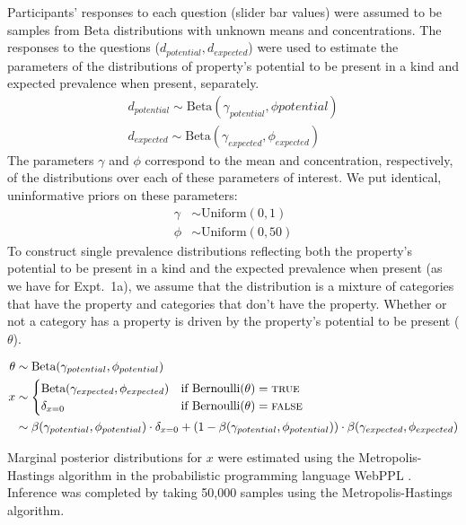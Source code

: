 \documentclass[10pt,letterpaper]{article}
\begin{document}
Participants' responses to each question (slider bar values) were assumed to be samples from Beta distributions with unknown means and concentrations. 
The responses to the questions ($d_{potential}, d_{expected}$) were used to estimate the parameters of the distributions of property's potential to be present in a kind and expected prevalence when present, separately. 
\begin{align*}
d_{potential} \sim \text{Beta}(\gamma_{potential}, \phi{potential}) \\
d_{expected} \sim \text{Beta}(\gamma_{expected}, \phi_{expected}) 
\end{align*}
The parameters $\gamma$ and $\phi$ correspond to the mean and concentration, respectively, of the distributions over each of these parameters of interest.
We put identical, uninformative priors on these parameters:
\begin{align*}
\gamma & \sim \text{Uniform}(0,1) \\
\phi & \sim \text{Uniform}(0,50) 
\end{align*}
To construct single prevalence distributions reflecting both the property's potential to be present in a kind and the expected prevalence when present (as we have for Expt.~1a), we assume that the distribution is a mixture of categories that have the property and categories that don't have the property.
Whether or not a category has a property is driven by the property's potential to be present ($\theta$).
%

\begin{align*}
\theta & \sim \text{Beta}(\gamma_{potential}, \phi_{potential}) \\ 
x & \sim \begin{cases} 
		\text{Beta}(\gamma_{expected}, \phi_{expected}) &\mbox{if } \text{Bernoulli}(\theta) = \textsc{true} \\
				\delta_{x=0} &\mbox{if } \text{Bernoulli}(\theta) = \textsc{false} \\
		\end{cases} \\
	 &  \sim \beta(\gamma_{potential},\phi_{potential})  \cdot \delta_{x=0} + (1-\beta(\gamma_{potential},\phi_{potential}) ) \cdot \beta(\gamma_{expected},\phi_{expected})
\end{align*}

%
Marginal posterior distributions for $x$ were estimated using the Metropolis-Hastings algorithm in the probabilistic programming language WebPPL \cite{dippl}. Inference was completed by taking 50,000 samples using the Metropolis-Hastings algorithm.
\end{document}
